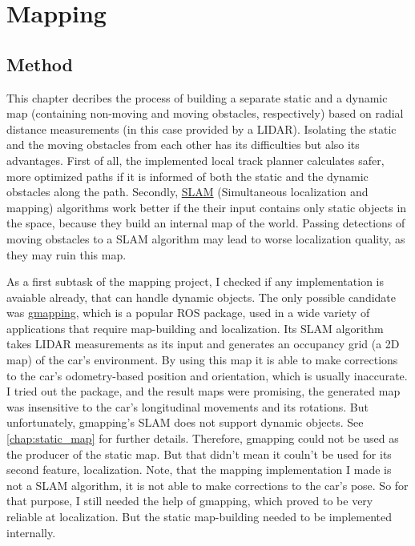 \chapter{Mapping}

\section{Method}
This chapter decribes the process of building a separate static and a dynamic map (containing non-moving and moving obstacles, respectively) based on radial distance measurements (in this case provided by a LIDAR). Isolating the static and the moving obstacles from each other has its difficulties but also its advantages. First of all, the implemented local track planner calculates safer, more optimized paths if it is informed of both the static and the dynamic obstacles along the path. Secondly, \href{https://en.wikipedia.org/wiki/Simultaneous_localization_and_mapping}{SLAM} (Simultaneous localization and mapping) algorithms work better if the their input contains only static objects in the space, because they build an internal map of the world. Passing detections of moving obstacles to a SLAM algorithm may lead to worse localization quality, as they may ruin this map.

As a first subtask of the mapping project, I checked if any implementation is avaiable already, that can handle dynamic objects. The only possible candidate was \href{http://wiki.ros.org/gmapping}{gmapping}, which is a popular ROS package, used in a wide variety of applications that require map-building and localization. Its SLAM algorithm takes LIDAR measurements as its input and generates an occupancy grid (a 2D map) of the car's environment. By using this map it is able to make corrections to the car's odometry-based position and orientation, which is usually inaccurate. I tried out the package, and the result maps were promising, the generated map was insensitive to the car's longitudinal movements and its rotations. But unfortunately, gmapping's SLAM does not support dynamic objects. See \autoref{chap:static_map} for further details. Therefore, gmapping could not be used as the producer of the static map. But that didn't mean it couln't be used for its second feature, localization. Note, that the mapping implementation I made is not a SLAM algorithm, it is not able to make corrections to the car's pose. So for that purpose, I still needed the help of gmapping, which proved to be very reliable at localization. But the static map-building needed to be implemented internally.

